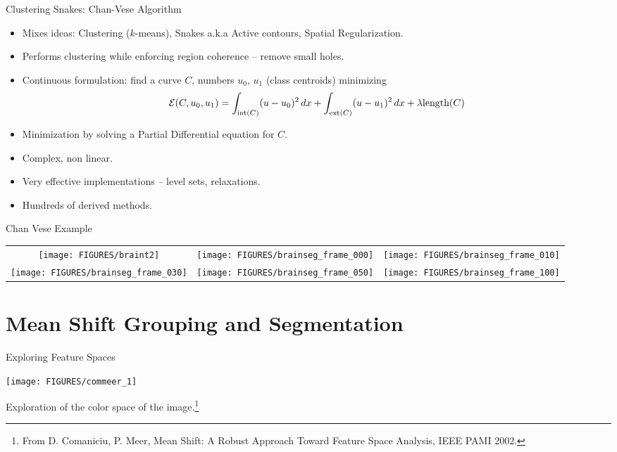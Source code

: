 \documentclass[9pt]{beamer}
\begin{document}
\begin{frame}[t]{Clustering Snakes: Chan-Vese Algorithm}
  \begin{itemize}
  \item Mixes ideas: Clustering ($k$-means), Snakes a.k.a Active contours, Spatial Regularization.
  \item Performs clustering while enforcing region coherence -- remove small holes.\vfill
  \item Continuous formulation: find a curve $C$, numbers $u_0$, $u_1$ (class centroids)  minimizing
    $$
    {\mathcal E}(C,u_0,u_1) = \int_{\text{int}(C)}(u-u_0)^2\,dx + \int_{\text{ext}(C)}(u-u_1)^2\,dx +  \lambda\text{length}(C) 
    $$\vfill
  \item Minimization by solving a Partial Differential equation for $C$.\vfill
  \item Complex, non linear.\vfill
  \item Very effective implementations -- level sets, relaxations.\vfill
  \item Hundreds of derived methods.\vfill
  \end{itemize}
\end{frame}


\begin{frame}[t]{Chan Vese Example}
  \begin{center}
    \begin{tabular}[h]{ccc}
      \texttt{[image: FIGURES/braint2]} & 
      \texttt{[image: FIGURES/brainseg\_frame\_000]} &
      \texttt{[image: FIGURES/brainseg\_frame\_010]}\\
      \texttt{[image: FIGURES/brainseg\_frame\_030]} &
      \texttt{[image: FIGURES/brainseg\_frame\_050]} &
      \texttt{[image: FIGURES/brainseg\_frame\_100]}
    \end{tabular}
  \end{center}
\end{frame}


\section{Mean Shift Grouping and Segmentation}
\label{sec:meanshift}

\begin{frame}{Exploring Feature Spaces}
  \begin{center}
  \texttt{[image: FIGURES/commeer\_1]}  
  \end{center}
  Exploration of the color space of the image.\footnote{From
    D. Comaniciu, P. Meer, Mean Shift: A Robust Approach Toward
    Feature Space Analysis, IEEE PAMI 2002.}
\end{frame}
\end{document}
